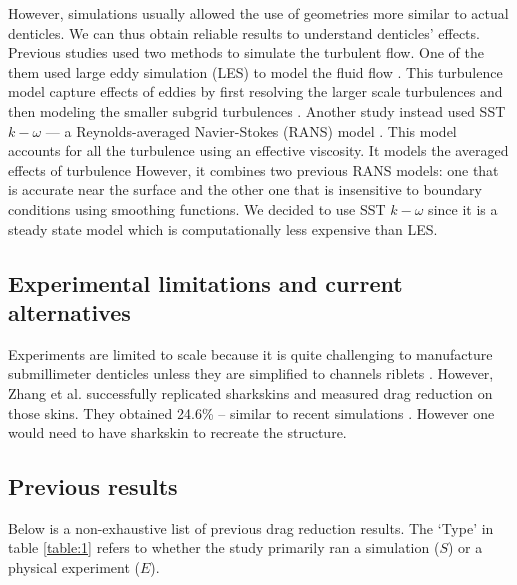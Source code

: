 \documentclass[graybox]{svmult}
\begin{document}
However, simulations usually allowed the use of geometries more similar to actual denticles. We can thus obtain reliable results to understand denticles' effects. Previous studies used two methods to simulate the turbulent flow. One of the them used large eddy simulation (LES) to model the fluid flow \cite{zhang_numerical_2018}. This turbulence model capture effects of eddies by first resolving the larger scale turbulences and then modeling the smaller subgrid turbulences \cite{smagorinsky_general_1963}. Another study instead used SST $k-\omega$ — a Reynolds-averaged Navier-Stokes (RANS) model \cite{mawignon_optimization_2023}. This model accounts for all the turbulence using an effective viscosity. It models the averaged effects of turbulence However, it combines two previous RANS models: one that is accurate near the surface and the other one that is insensitive to boundary conditions \cite{menter_two-equation_1994} using smoothing functions. We decided to use SST $k-\omega$ since it is a steady state model which is computationally less expensive than LES.

\subsection{Experimental limitations and current alternatives}

Experiments are limited to scale because it is quite challenging to manufacture submillimeter denticles unless they are simplified to channels riblets \cite{graybill_experimental_2024}. However, Zhang et al. successfully replicated sharkskins and measured drag reduction on those skins. They obtained 24.6\% -- similar to recent simulations \cite{zhang_high-precision_2011, guo_experimental_2023}. However one would need to have sharkskin to recreate the structure.

\subsection{Previous results}

Below is a non-exhaustive list of previous drag reduction results. The `Type' in table \ref{table:1} refers to whether the study primarily ran a simulation ($S$) or a physical experiment ($E$).
\end{document}
